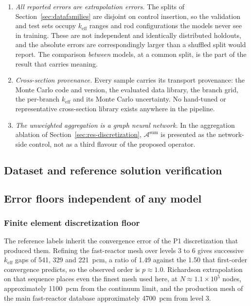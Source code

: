 \documentclass[preprint,12pt]{elsarticle}
\newcommand{\keff}{k_{\mathrm{eff}}}
\begin{document}
\begin{enumerate}
\item \emph{All reported errors are extrapolation errors.} The splits of
Section~\ref{sec:datafamilies} are disjoint on control insertion, so the
validation and test sets occupy $\keff$ ranges and rod configurations the models
never see in training. These are not independent and identically distributed
holdouts, and the absolute errors are correspondingly larger than a shuffled
split would report. The comparison \emph{between} models, at a common split, is
the part of the result that carries meaning.
\item \emph{Cross-section provenance.} Every sample carries its transport
provenance: the Monte Carlo code and version, the evaluated data library, the
branch grid, the per-branch $\keff$ and its Monte Carlo uncertainty. No
hand-tuned or representative cross-section library exists anywhere in the
pipeline.
\item \emph{The unweighted aggregation is a graph neural network.} In the
aggregation ablation of Section~\ref{sec:res-discretization},
$\mathcal{A}^{\mathrm{sum}}$ is presented as the network-side control, not as a
third flavour of the proposed operator.
\end{enumerate}

\subsection{Dataset and reference solution verification}
\label{sec:res-verification}

\subsection{Error floors independent of any model}
\label{sec:res-floors}

\subsubsection{Finite element discretization floor}
\label{sec:res-femfloor}

The reference labels inherit the convergence error of the P1 discretization
that produced them. Refining the fast-reactor mesh over levels 3 to 6 gives
successive $\keff$ gaps of 541, 329 and 221~pcm, a ratio of 1.49 against the
1.50 that first-order convergence predicts, so the observed order is
$p \approx 1.0$. Richardson extrapolation on that sequence places even the
finest mesh used here, at $N \approx 1.1\times10^{5}$ nodes, approximately
1100~pcm from the continuum limit, and the production mesh of the main
fast-reactor database approximately 4700~pcm from level 3.
\end{document}
